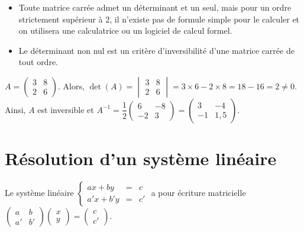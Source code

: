 \documentclass{cornouaille}
\begin{document}
\begin{remarques}
\begin{itemize}
\item Toute matrice carrée admet un déterminant et un seul, mais pour un ordre strictement supérieur à 2,
il n'existe pas de formule simple pour le calculer et on utilisera une calculatrice ou un logiciel de calcul formel.
\item Le déterminant non nul est un critère d'inversibilité d'une matrice carrée de tout ordre.
\end{itemize}
\end{remarques}

\begin{exemple}
$A=\begin{pmatrix}
 3 & 8 \\
2 & 6\end{pmatrix}$. Alors, $\det(A)=\begin{vmatrix}
 3 & 8 \\
2 & 6
\end{vmatrix}=3\times6-2\times8=18-16=2\neq0$.\\
Ainsi, $A$ est inversible et $A^{-1}=\dfrac{1}{2}
\begin{pmatrix}
 6 & -8 \\
-2 & 3\end{pmatrix}=\begin{pmatrix}
 3 & -4 \\
-1 & 1,5\end{pmatrix}$.
\end{exemple}


\section{Résolution d'un système linéaire}

\begin{propriete}
Le système linéaire
$\left\{\begin{array}{ccc}
ax+by & = & c\\
a'x+b'y & = & c'
\end{array}\right.$
 a pour écriture matricielle
$\begin{pmatrix}
 a & b \\
 a' & b'\end{pmatrix}\begin{pmatrix}
 x  \\
y \end{pmatrix}=\begin{pmatrix}
 c  \\
c' \end{pmatrix}$.
\end{propriete}
\end{document}
